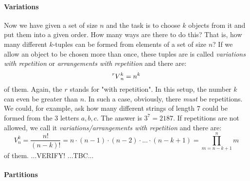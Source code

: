 

\paragraph{Variations}
Now we have given a set of size $n$ and the task is to choose $k$ objects from it and put them into a given order. How many ways are there to do this? That is, how many different $k$-tuples can be formed from elements of a set of size $n$? If we allow an object to be chosen more than once, these tuples are is called \emph{variations with repetition} or \emph{arrangements with repetition} and there are:
\begin{equation}
\prescript{r}{}{V}_n^k = n^k
\end{equation}
of them. Again, the $r$ stands for "with repetition". In this setup, the number $k$ can even be greater than $n$. In such a case, obviously, there \emph{must} be repetitions. We could, for example, ask how many different strings of length $7$ could be formed from the $3$ letters $a,b,c$. The answer is $3^7 = 2187$. If repetitions are not allowed, we call it \emph{variations/arrangements with repetition} and there are:
\begin{equation}
V_n^k = \frac{n!}{(n-k)!} 
      = n \cdot (n-1) \cdot (n-2) \cdot \ldots \cdot (n-k+1) 
      = \prod_{m=n-k+1}^{n} m
\end{equation}
of them. ...VERIFY! ...TBC...




% 

\paragraph{Partitions}




\begin{comment}



\end{comment}


